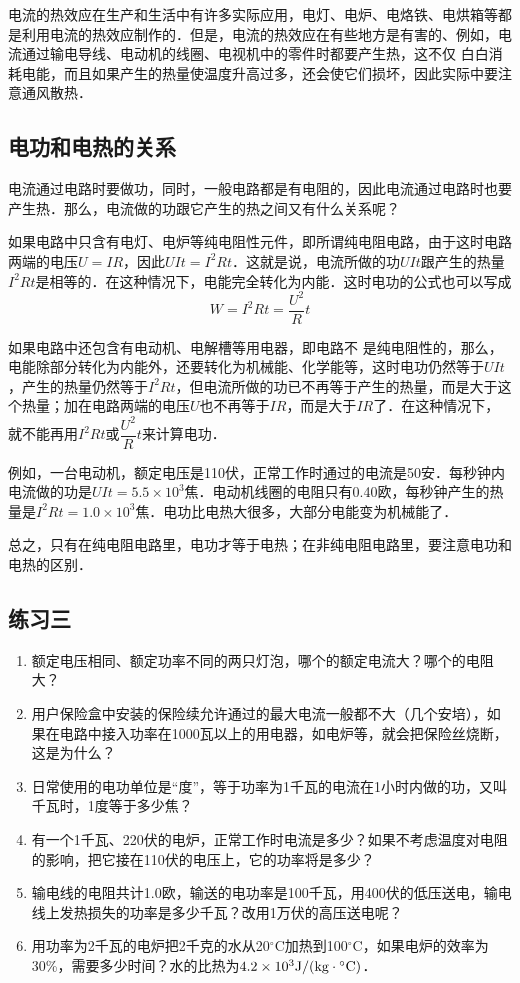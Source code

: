 电流的热效应在生产和生活中有许多实际应用，电灯、电炉、电烙铁、电烘箱等都是利用电流的热效应制作的．但是，电流的热效应在有些地方是有害的、例如，电流通过输电导线、电动机的线圈、电视机中的零件时都要产生热，这不仅
白白消耗电能，而且如果产生的热量使温度升高过多，还会使它们损坏，因此实际中要注意通风散热．

\subsection{电功和电热的关系} 

电流通过电路时要做功，同时，一般电路都是有电阻的，因此电流通过电路时也要产生热．那么，电流做的功跟它产生的热之间又有什么关系呢？

如果电路中只含有电灯、电炉等纯电阻性元件，即所谓纯电阻电路，由于这时电路两端的电压$U=IR$，因此$UIt=I^2Rt$．这就是说，电流所做的功$UIt$跟产生的热量$I^2Rt$是相等的．在这种情况下，电能完全转化为内能．这时电功的公式也可以写成
\[W=I^2Rt=\frac{U^2}{R}t\]

如果电路中还包含有电动机、电解槽等用电器，即电路不
是纯电阻性的，那么，电能除部分转化为内能外，还要转化为机械能、化学能等，这时电功仍然等于$UIt$，产生的热量仍然等于$I^2Rt$，但电流所做的功已不再等于产生的热量，而是大于这个热量；加在电路两端的电压$U$也不再等于$IR$，而是大于$IR$了．在这种情况下，就不能再用$I^2Rt$或$\dfrac{U^2}{R}t$来计算电功．

例如，一台电动机，额定电压是110伏，正常工作时通过的电流是50安．每秒钟内电流做的功是$UIt=5.5\times10^3$焦．电动机线圈的电阻只有0.40欧，每秒钟产生的热量是$I^2Rt=1.0\times10^3$焦．电功比电热大很多，大部分电能变为机械能了．

总之，只有在纯电阻电路里，电功才等于电热；在非纯电阻电路里，要注意电功和电热的区别．

\subsection*{练习三}
\begin{enumerate}
    \item 额定电压相同、额定功率不同的两只灯泡，哪个的额定电流大？哪个的电阻大？
    \item 用户保险盒中安装的保险续允许通过的最大电流一般都不大（几个安培），如果在电路中接入功率在1000瓦以上的用电器，如电炉等，就会把保险丝烧断，这是为什么？
    \item 日常使用的电功单位是“度”，等于功率为1千瓦的电流在1小时内做的功，又叫千瓦时，1度等于多少焦？
    \item 有一个1千瓦、220伏的电炉，正常工作时电流是多少？如果不考虑温度对电阻的影响，把它接在110伏的电压上，它的功率将是多少？
    \item 输电线的电阻共计1.0欧，输送的电功率是100千瓦，用400伏的低压送电，输电线上发热损失的功率是多少千瓦？改用1万伏的高压送电呢？
    \item 用功率为2千瓦的电炉把2千克的水从20$^\circ$C加热到100$^\circ$C，如果电炉的效率为30\%，需要多少时间？水的比热为$4.2\times10^3{\rm J}/({\rm kg}\cdot {}^\circ {\rm C})$．
\end{enumerate}

